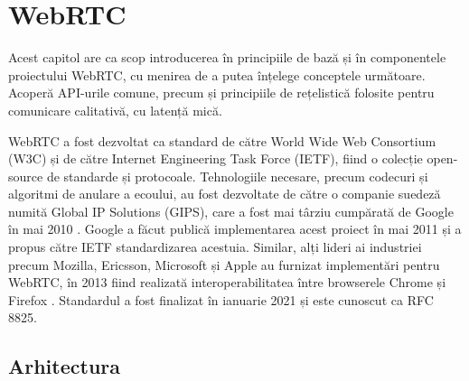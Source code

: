 \chapter{WebRTC}
\label{chap:ch3}

\indent \par Acest capitol are ca scop introducerea în principiile de bază și în componentele proiectului WebRTC, cu menirea de a putea înțelege conceptele următoare. Acoperă API-urile comune, precum și principiile de rețelistică folosite pentru comunicare calitativă, cu latență mică.
\indent \par WebRTC a fost dezvoltat ca standard de către World Wide Web Consortium (W3C) și de către Internet Engineering Task Force (IETF), fiind o colecție open-source de standarde și protocoale. Tehnologiile necesare, precum codecuri și algoritmi de anulare a ecoului, au fost dezvoltate de către o companie suedeză numită Global IP Solutions (GIPS), care a fost mai târziu cumpărată de Google în mai 2010 \cite{WebNSM2017, ACMRTC}. Google a făcut publică implementarea acest proiect în mai 2011 și a propus către IETF standardizarea acestuia. Similar, alți lideri ai industriei precum Mozilla, Ericsson, Microsoft și Apple au furnizat implementări pentru WebRTC, în 2013 fiind realizată interoperabilitatea între browserele Chrome și Firefox \cite{Nyman2013}. Standardul a fost finalizat în ianuarie 2021 și este cunoscut ca RFC 8825.

\section{Arhitectura}
\label{sec:ch3sec1}

